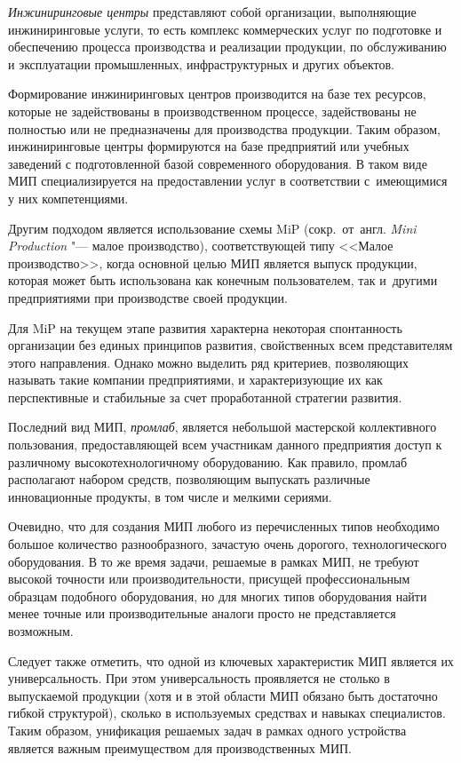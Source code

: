 \textit{Инжиниринговые центры} представляют собой организации, выполняющие инжиниринговые услуги, то есть комплекс коммерческих услуг по подготовке и обеспечению процесса производства и реализации продукции, по обслуживанию и эксплуатации промышленных, инфраструктурных и других объектов.

Формирование инжиниринговых центров производится на базе тех ресурсов, которые не задействованы в производственном процессе, задействованы не полностью или не предназначены для производства продукции. Таким образом, инжиниринговые центры формируются на базе предприятий или учебных заведений с подготовленной базой современного оборудования. В таком виде МИП специализируется на предоставлении услуг в соответствии с~имеющимися у них компетенциями.

Другим подходом является использование схемы MiP (сокр.~от~англ. \textit{Mini Production} "--- малое производство), соответствующей типу <<Малое производство>>, когда основной целью МИП является выпуск продукции, которая может быть использована как конечным пользователем, так и~другими предприятиями при производстве своей продукции.

Для MiP на текущем этапе развития характерна некоторая спонтанность организации без единых принципов развития, свойственных всем представителям этого направления. Однако можно выделить ряд критериев, позволяющих называть такие компании предприятиями, и характеризующие их как перспективные и стабильные за счет проработанной стратегии развития.

Последний вид МИП, \textit{промлаб}, является небольшой мастерской коллективного пользования, предоставляющей всем участникам данного предприятия доступ к различному высокотехнологичному оборудованию. Как правило, промлаб располагают набором средств, позволяющим выпускать различные инновационные продукты, в том числе и мелкими сериями. 

Очевидно, что для создания МИП любого из перечисленных типов необходимо большое количество разнообразного, зачастую очень дорогого, технологического оборудования. В то же время задачи, решаемые в рамках МИП, не требуют высокой точности или производительности, присущей профессиональным образцам подобного оборудования, но для многих типов оборудования найти менее точные или производительные аналоги просто не представляется возможным.

Следует также отметить, что одной из ключевых характеристик МИП является их универсальность. При этом универсальность проявляется не столько в выпускаемой продукции (хотя и в этой области МИП обязано быть достаточно гибкой структурой), сколько в используемых средствах и навыках специалистов. Таким образом, унификация решаемых задач в рамках одного устройства является важным преимуществом для производственных МИП.

